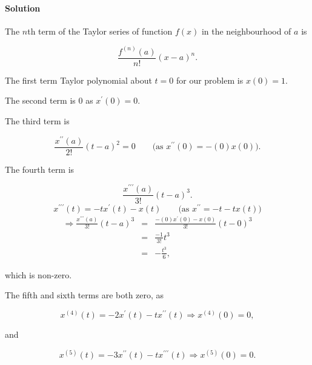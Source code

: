 

\paragraph{Solution}

The $n$th term of the Taylor series of function $f\left(x\right)$ in the neighbourhood of $a$ is

\[\frac{f^{\left(n\right)}\left(a\right)}{n!}\left(x-a\right)^n.\]

The first term Taylor polynomial about $t=0$ for our problem is $x\left(0\right)=1$.

The second term is $0$ as $x^\prime\left(0\right)=0$.

The third term is

\[\frac{x^{\prime\prime}\left(a\right)}{2!}\left(t-a\right)^2=0\qquad\mbox{(as }x^{\prime\prime}\left(0\right)=-\left(0\right)x\left(0\right)\mbox{).}\]

The fourth term is

\[\frac{x^{\prime\prime\prime}\left(a\right)}{3!}\left(t-a\right)^3.\]
\[x^{\prime\prime\prime}\left(t\right)=-tx^\prime\left(t\right)-x\left(t\right)\qquad\mbox{(as }x^{\prime\prime}=-t-tx\left(t\right)\mbox{)}\]
\begin{eqnarray*}
	\Rightarrow\frac{x^{\prime\prime\prime}\left(a\right)}{3!}\left(t-a\right)^3&=&\frac{-\left(0\right)x^\prime\left(0\right)-x\left(0\right)}{3!}\left(t-0\right)^3\\
	&=&\frac{-1}{3!}t^3\\
	&=&-\frac{t^3}{6},
\end{eqnarray*}

which is non-zero.

The fifth and sixth terms are both zero, as

\[x^{\left(4\right)}\left(t\right)=-2x^\prime\left(t\right)-tx^{\prime\prime}\left(t\right)\Rightarrow x^{\left(4\right)}\left(0\right)=0,\]

and

\[x^{\left(5\right)}\left(t\right)=-3x^{\prime\prime}\left(t\right)-tx^{\prime\prime\prime}\left(t\right)\Rightarrow x^{\left(5\right)}\left(0\right)=0.\]

